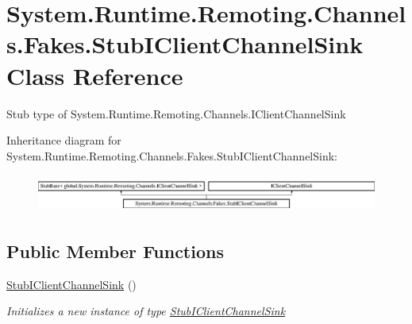 \hypertarget{class_system_1_1_runtime_1_1_remoting_1_1_channels_1_1_fakes_1_1_stub_i_client_channel_sink}{\section{System.\-Runtime.\-Remoting.\-Channels.\-Fakes.\-Stub\-I\-Client\-Channel\-Sink Class Reference}
\label{class_system_1_1_runtime_1_1_remoting_1_1_channels_1_1_fakes_1_1_stub_i_client_channel_sink}
}


Stub type of System.\-Runtime.\-Remoting.\-Channels.\-I\-Client\-Channel\-Sink 


Inheritance diagram for System.\-Runtime.\-Remoting.\-Channels.\-Fakes.\-Stub\-I\-Client\-Channel\-Sink\-:\begin{figure}[H]
\begin{center}
\leavevmode
\includegraphics[height=1.258427cm]{class_system_1_1_runtime_1_1_remoting_1_1_channels_1_1_fakes_1_1_stub_i_client_channel_sink}
\end{center}
\end{figure}
\subsection*{Public Member Functions}
\begin{DoxyCompactItemize}
\item 
\hyperlink{class_system_1_1_runtime_1_1_remoting_1_1_channels_1_1_fakes_1_1_stub_i_client_channel_sink_a4dffc7f835640385b40ec06dc1f6f6df}{Stub\-I\-Client\-Channel\-Sink} ()
\begin{DoxyCompactList}\small\item\em Initializes a new instance of type \hyperlink{class_system_1_1_runtime_1_1_remoting_1_1_channels_1_1_fakes_1_1_stub_i_client_channel_sink}{Stub\-I\-Client\-Channel\-Sink}\end{DoxyCompactList}\end{DoxyCompactItemize}
